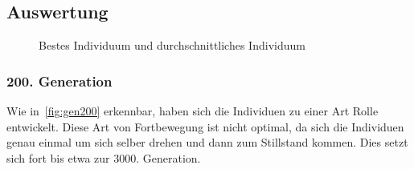     \subsection{Auswertung}

      \begin{figure}[H]
        \centering
        
        \caption{Bestes Individuum und durchschnittliches Individuum\label{fig:graphFourth}}
      \end{figure}

      \subsubsection{200. Generation}

        Wie in~\vref{fig:gen200} erkennbar, haben sich die Individuen zu einer Art Rolle entwickelt.
        Diese Art von Fortbewegung ist nicht optimal,
        da sich die Individuen genau einmal um sich selber drehen und dann zum Stillstand kommen.
        Dies setzt sich fort bis etwa zur 3000. Generation.

        \vspace{0.5cm}

